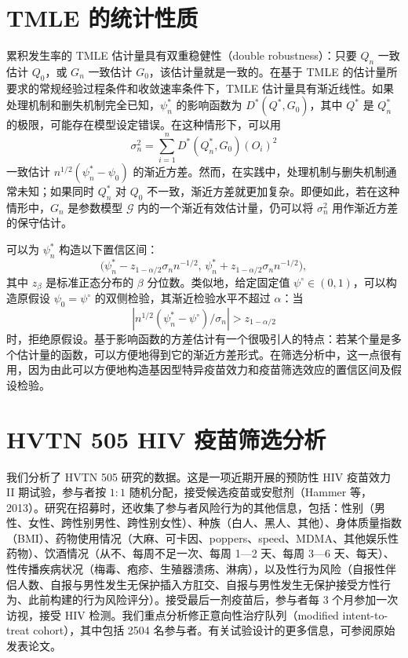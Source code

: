 \section{TMLE 的统计性质}

累积发生率的 TMLE 估计量具有双重稳健性（double robustness）：只要 $Q_n$ 一致估计 $Q_0$，或 $G_n$ 一致估计 $G_0$，该估计量就是一致的。在基于 TMLE 的估计量所要求的常规经验过程条件和收敛速率条件下，TMLE 估计量具有渐近线性。如果处理机制和删失机制完全已知，$\psi_n^*$ 的影响函数为 $D^*(Q^*,G_0)$，其中 $Q^*$ 是 $Q_n^*$ 的极限，可能存在模型设定错误。在这种情形下，可以用
\[
 \sigma_n^2=\sum_{i=1}^nD^*(Q_n^*,G_0)(O_i)^2
\]
一致估计 $n^{1/2}(\psi_n^*-\psi_0)$ 的渐近方差。然而，在实践中，处理机制与删失机制通常未知；如果同时 $Q_n^*$ 对 $Q_0$ 不一致，渐近方差就更加复杂。即便如此，若在这种情形中，$G_n$ 是参数模型 $\mathcal G$ 内的一个渐近有效估计量，仍可以将 $\sigma_n^2$ 用作渐近方差的保守估计。

可以为 $\psi_n^*$ 构造以下置信区间：
\[
 \bigl(
 \psi_n^*-z_{1-\alpha/2}\sigma_n n^{-1/2},\,
 \psi_n^*+z_{1-\alpha/2}\sigma_n n^{-1/2}
 \bigr),
\]
其中 $z_\beta$ 是标准正态分布的 $\beta$ 分位数。类似地，给定固定值 $\psi^\circ\in(0,1)$，可以构造原假设 $\psi_0=\psi^\circ$ 的双侧检验，其渐近检验水平不超过 $\alpha$：当
\[
 \left|n^{1/2}(\psi_n^*-\psi^\circ)/\sigma_n\right|>z_{1-\alpha/2}
\]
时，拒绝原假设。基于影响函数的方差估计有一个很吸引人的特点：若某个量是多个估计量的函数，可以方便地得到它的渐近方差形式。在筛选分析中，这一点很有用，因为由此可以方便地构造基因型特异疫苗效力和疫苗筛选效应的置信区间及假设检验。

\section{HVTN 505 HIV 疫苗筛选分析}

我们分析了 HVTN 505 研究的数据。这是一项近期开展的预防性 HIV 疫苗效力 II 期试验，参与者按 $1:1$ 随机分配，接受候选疫苗或安慰剂（Hammer 等，2013）。研究在招募时，还收集了参与者风险行为的其他信息，包括：性别（男性、女性、跨性别男性、跨性别女性）、种族（白人、黑人、其他）、身体质量指数（BMI）、药物使用情况（大麻、可卡因、poppers、speed、MDMA、其他娱乐性药物）、饮酒情况（从不、每周不足一次、每周 1—2 天、每周 3—6 天、每天）、性传播疾病状况（梅毒、疱疹、生殖器溃疡、淋病），以及性行为风险（自报性伴侣人数、自报与男性发生无保护插入方肛交、自报与男性发生无保护接受方性行为、此前构建的行为风险评分）。接受最后一剂疫苗后，参与者每 3 个月参加一次访视，接受 HIV 检测。我们重点分析修正意向性治疗队列（modified intent-to-treat cohort），其中包括 2504 名参与者。有关试验设计的更多信息，可参阅原始发表论文。


